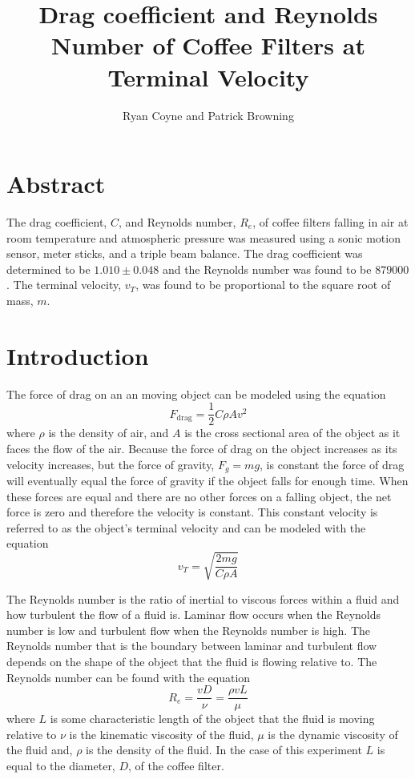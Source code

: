 \documentclass[12pt]{article}
\begin{document}
    \title{Drag coefficient and Reynolds Number of Coffee Filters at Terminal Velocity}
    \author{Ryan Coyne and Patrick Browning}
    \maketitle
    \section{Abstract}
        The drag coefficient, \(C\), and Reynolds number, \(R_e\), of coffee filters falling in air at room temperature and atmospheric pressure was measured using a sonic motion sensor, meter sticks, and a triple beam balance. The drag coefficient was determined to be \(1.010 \pm 0.048\) and the Reynolds number was found to be \(879000\). The terminal velocity, \(v_T\), was found to be proportional to the square root of mass, \(m\). 
    \section{Introduction}
        The force of drag on an an moving object can be modeled using the equation
        \begin{equation*}
            F_{\mathrm{drag}} = \frac{1}{2}C\rho Av^2
        \end{equation*}
        where \(\rho\) is the density of air, and \(A\) is the cross sectional area of the object as it faces the flow of the air. Because the force of drag on the object increases as its velocity increases, but the force of gravity, \(F_g = mg\), is constant the force of drag will eventually equal the force of gravity if the object falls for enough time. When these forces are equal and there are no other forces on a falling object, the net force is zero and therefore the velocity is constant. This constant velocity is referred to as the object's terminal velocity and can be modeled with the equation
        \begin{equation*}
            v_T = \sqrt{\frac{2mg}{C\rho A}}
        \end{equation*}

        The Reynolds number is the ratio of inertial to viscous forces within a fluid and how turbulent the flow of a fluid is. Laminar flow occurs when the Reynolds number is low and turbulent flow when the Reynolds number is high. The Reynolds number that is the boundary between laminar and turbulent flow depends on the shape of the object that the fluid is flowing relative to. The Reynolds number can be found with the equation 
        \begin{equation*}
            R_e = \frac{vD}{\nu} =\frac{\rho vL}{\mu}
        \end{equation*}
        where \(L\) is some characteristic length of the object that the fluid is moving relative to \(\nu\) is the kinematic viscosity of the fluid, \(\mu\) is the dynamic viscosity of the fluid and, \(\rho\) is the density of the fluid. In the case of this experiment \(L\) is equal to the diameter, \(D\), of the coffee filter. 
\end{document}
